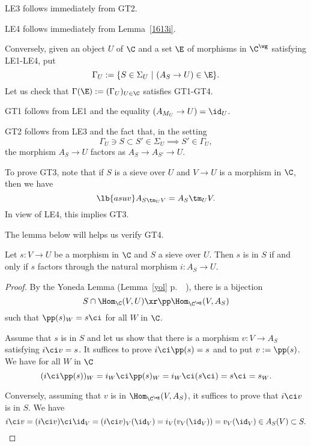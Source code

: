 \documentclass[12pt]{article}
\theoremstyle{remark}
\theoremstyle{definition}
\begin{document}
\nn LE3 follows immediately from GT2.

\nn LE4 follows immediately from Lemma~\ref{1613i}. %

Conversely, given an object $U$ of $\C$ and a set $\E$ of morphisms in $\C^\wg$ satisfying LE1-LE4, put
$$
\Gamma_U:=\{S\in\Sigma_U\ |\ (A_S\to U)\in\E\}.
$$
Let us check that $\Gamma(\E):=(\Gamma_U)_{U\in\C}$ satisfies GT1-GT4.

GT1 follows from LE1 and the equality $(A_{M_U}\to U)=\id_U$. 

GT2 follows from LE3 and the fact that, in the setting 
$$
\Gamma_U\ni S\subset S'\in\Sigma_U\implies S'\in\Gamma_U,
$$ 
the morphism $A_S\to U$ factors as $A_S\to A_{S'}\to U$. 

To prove GT3, note that if $S$ is a sieve over $U$ and $V\to U$ is a morphism in $\C$, then we have 
%
\begin{equation}\lb{asuv}
A_{S\tm_UV}=A_S\tm_UV.
\end{equation}
%
In view of LE4, this implies GT3.  

The lemma below will helps us verify GT4. 

\begin{lem}
Let $s:V\to U$ be a morphism in $\C$ and $S$ a sieve over $U$. Then $s$ is in $S$ if and only if $s$ factors through the natural morphism $i:A_S\to U$.
\end{lem}

\begin{proof}
By the Yoneda Lemma (Lemma~\ref{yol} p.~~), there is a bijection 
$$
S\cap\Hom_\C(V,U)\xr\pp\Hom_{\C^\wg}(V,A_S)
$$
such that $\pp(s)_W=s\ci$ for all $W$ in $\C$. 

Assume that $s$ is in $S$ and let us show that there is a morphism $v:V\to A_S$ satisfying $i\ci v=s$. It suffices to prove $i\ci\pp(s)=s$ and to put $v:=\pp(s)$. We have for all $W$ in $\C$
$$
(i\ci\pp(s))_W=i_W\ci\pp(s)_W=i_W\ci(s\ci)=s\ci=s_W.
$$ 

Conversely, assuming that $v$ is in $\Hom_{\C^\wg}(V,A_S)$, it suffices to prove that $i\ci v$ is in $S$. We have 
$$
i\ci v=(i\ci v)\ci\id_V=(i\ci v)_V(\id_V)=i_V(v_V(\id_V))=v_V(\id_V)\in A_S(V)\subset S. 
$$ 
\end{proof} 
\end{document}
